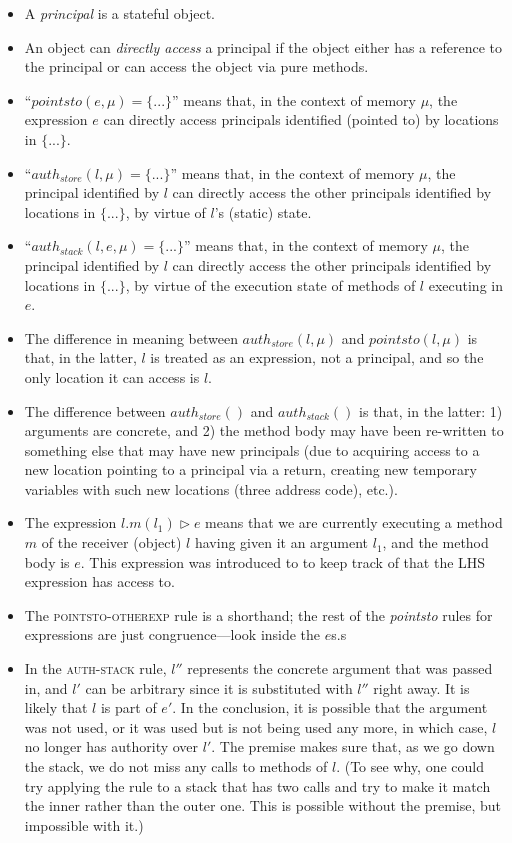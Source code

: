 \documentclass{llncs}
\begin{document}
\begin{itemize}
\item A \textit{principal} is a stateful object.
\item An object can \emph{directly access} a principal if the object either has a reference to the principal or can access the object via pure methods.
\item ``$pointsto(e, \mu) = \{ ... \}$'' means that, in the context of memory $\mu$, the expression $e$ can directly access principals identified (pointed to) by locations in $\{ ... \}$.
\item ``$auth_{store}(l, \mu) = \{ ... \}$'' means that, in the context of memory $\mu$, the principal identified by $l$ can directly access the other principals identified by locations in $\{ ... \}$, by virtue of $l$'s (static) state.
\item ``$auth_{stack}(l, e, \mu) = \{ ... \}$'' means that, in the context of memory $\mu$, the principal identified by $l$ can directly access the other principals identified by locations in $\{ ... \}$, by virtue of the execution state of methods of $l$ executing in $e$.
\item The difference in meaning between $auth_{store}(l, \mu)$ and $pointsto(l, \mu)$ is that, in the latter, $l$ is treated as an expression, not a principal, and so the only location it can access is $l$.
\item The difference between $auth_{store}()$ and $auth_{stack}()$ is that, in the latter: 1) arguments are concrete, and 2) the method body may have been re-written to something else that may have new principals (due to acquiring access to a new location pointing to a principal via a return, creating new temporary variables with such new locations (three address code), etc.).
\item The expression $l.m(l_1) \rhd e$ means that we are currently executing a method $m$ of the receiver (object) $l$ having given it an argument $l_1$, and the method body is $e$. This expression was introduced to to keep track of that the LHS expression has access to.
\item The \textsc{pointsto-otherexp} rule is a shorthand; the rest of the \textit{pointsto} rules for expressions are just congruence---look inside the $e$s.s
\item In the \textsc{auth-stack} rule, $l''$ represents the concrete argument that was passed in, and $l'$ can be arbitrary since it is substituted with $l''$ right away.  It is likely that $l$ is part of $e'$. In the conclusion, it is possible that the argument was not used, or it was used but is not being used any more, in which case, $l$ no longer has authority over $l'$. The premise makes sure that, as we go down the stack, we do not miss any calls to methods of $l$. (To see why, one could try applying the rule to a stack that has two calls and try to make it match the inner rather than the outer one. This is possible without the premise, but impossible with it.)

\end{itemize}
\end{document}
